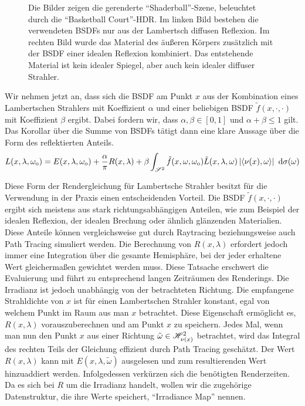 \begin{figure}
\begin{subfigure}[b]{0.5\textwidth}
			\end{subfigure}
			\caption[Wirkung zusammengesetzter Materialien anhand der \enquote{Shaderball}-Szene]{Die Bilder zeigen die gerenderte \enquote{Shaderball}-Szene, beleuchtet durch die \enquote{Basketball Court}-HDR. Im linken Bild bestehen die verwendeten BSDFs nur aus der Lambertsch diffusen Reflexion. Im rechten Bild wurde das Material des äußeren Körpers zusätzlich mit der BSDF einer idealen Reflexion kombiniert. Das entstehende Material ist kein idealer Spiegel, aber auch kein idealer diffuser Strahler.}
			\label{fig:shaderball-bsdf-sum}
		\end{figure}

		Wir nehmen jetzt an, dass sich die BSDF am Punkt $x$ aus der Kombination eines Lambertschen Strahlers mit Koeffizient $\alpha$ und einer beliebigen BSDF $\tilde{f}(x,\cdot,\cdot)$ mit Koeffizient $\beta$ ergibt.
		Dabei fordern wir, dass $\alpha,\beta\in[0,1]$ und $\alpha +\beta\leq 1$ gilt.
		Das Korollar über die Summe von BSDFs tätigt dann eine klare Aussage über die Form des reflektierten Anteils.
		\[
			L(x,\lambda,\omega_{\mathrm{o}}) = E(x,\lambda,\omega_{\mathrm{o}}) + \frac{\alpha}{\pi}R(x,\lambda) + \beta \int_{\mathscr{S}^{2}}^{} \tilde{f}(x,\omega,\omega_{\mathrm{o}})\tilde{L}(x,\lambda,\omega)\left\vert \left\langle \nu(x),\omega \right\rangle \right\vert\ \mathrm{d} \sigma(\omega)
		\]

		Diese Form der Rendergleichung für Lambertsche Strahler besitzt für die Verwendung in der Praxis einen entscheidenden Vorteil.
		Die BSDF $\tilde{f}(x,\cdot,\cdot)$ ergibt sich meistens aus stark richtungsabhängigen Anteilen, wie zum Beispiel der idealen Reflexion, der idealen Brechung oder ähnlich glänzenden Materialien.
		Diese Anteile können vergleichsweise gut durch Raytracing beziehungsweise auch Path Tracing simuliert werden.
		Die Berechnung von $R(x,\lambda)$ erfordert jedoch immer eine Integration über die gesamte Hemisphäre, bei der jeder erhaltene Wert gleichermaßen gewichtet werden muss.
		Diese Tatsache erschwert die Evaluierung und führt zu entsprechend langen Zeiträumen des Renderings.
		Die Irradianz ist jedoch unabhängig von der betrachteten Richtung.
		Die empfangene Strahldichte von $x$ ist für einen Lambertschen Strahler konstant, egal von welchem Punkt im Raum aus man $x$ betrachtet.
		Diese Eigenschaft ermöglicht es, $R(x,\lambda)$ vorauszuberechnen und am Punkt $x$ zu speichern.
		Jedes Mal, wenn man nun den Punkt $x$ aus einer Richtung $\tilde{\omega}\in\mathscr{H}^{2}_{\nu(x)}$ betrachtet, wird das Integral des rechten Teils der Gleichung effizient durch Path Tracing geschätzt. Der Wert $R(x,\lambda)$ kann mit $E(x,\lambda,\tilde{\omega})$ ausgelesen und zum resultierenden Wert hinzuaddiert werden.
		Infolgedessen verkürzen sich die benötigten Renderzeiten.
		Da es sich bei $R$ um die Irradianz handelt, wollen wir die zugehörige Datenstruktur, die ihre Werte speichert, \enquote{Irradiance Map} nennen.

